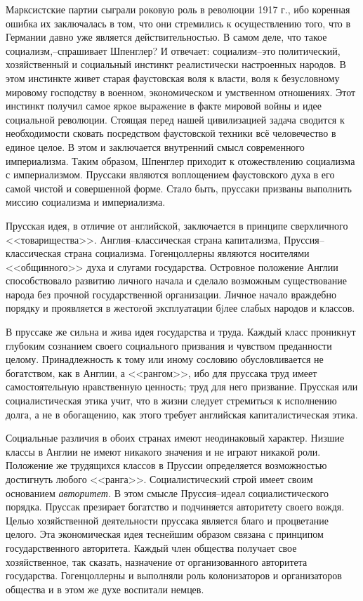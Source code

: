 Марксистские партии сыграли роковую роль в революции 1917 г., ибо коренная ошибка их заключалась в том, что они стремились к осуществлению того, что в Германии давно уже является действительностью. В самом деле, что такое социализм,\---спрашивает Шпенглер? И отвечает: социализм\---это политический, хозяйственный и социальный инстинкт реалистически настроенных народов. В этом инстинкте живет старая фаустовская воля к власти, воля к безусловному мировому господству в военном, экономическом и умственном отношениях. Этот инстинкт получил самое яркое выражение в факте мировой войны и идее социальной революции. Стоящая перед нашей цивилизацией задача сводится к необходимости сковать посредством фаустовской техники всё человечество в единое целое. В этом и заключается внутренний смысл современного империализма. Таким образом, Шпенглер приходит к отожествлению социализма с империализмом. Пруссаки являются воплощением фаустовского духа в его самой чистой и совершенной форме. Стало быть, пруссаки призваны выполнить миссию социализма и империализма.

Прусская идея, в отличие от английской, заключается в принципе сверхличного <<товарищества>>. Англия\---классическая страна капитализма, Пруссия\---классическая страна социализма. Гогенцоллерны являются носителями <<общинного>> духа и слугами государства. Островное положение Англии способствовало развитию личного начала и сделало возможным существование народа без прочной государственной организации. Личное начало враждебно порядку и проявляется в жестоrой эксплуатации бjлее слабых народов и классов.

В пруссаке же сильна и жива идея государства и труда. Каждый класс проникнут глубоким сознанием своего социального призвания и чувством преданности целому. Принадлежность к тому или иному сословию обусловливается не богатством, как в Англии, а <<рангом>>, ибо для пруссака труд имеет самостоятельную нравственную ценность; труд для него призвание. Прусская или социалистическая этика учит, что в жизни следует стремиться к исполнению долга, а не в обогащению, как этого требует английская капиталистическая этика.

Социальные различия в обоих странах имеют неодинаковый характер. Низшие классы в Англии не имеют никакого значения и не играют никакой роли. Положение же трудящихся классов в Пруссии определяется возможностью достигнуть любого <<ранга>>. Социалистический строй имеет своим основанием \emph{авторитет.} В этом смысле Пруссия\---идеал социалистического порядка. Пруссак презирает богатство и подчиняется авторитету своего вождя. Целью хозяйственной деятельности пруссака является благо и процветание целого. Эта экономическая идея теснейшим образом связана с принципом государственного авторитета. Каждый член общества получает свое хозяйственное, так сказать, назначение от организованного авторитета государства. Гогенцоллерны и выполняли роль колонизаторов и организаторов общества и в этом же духе воспитали немцев.

